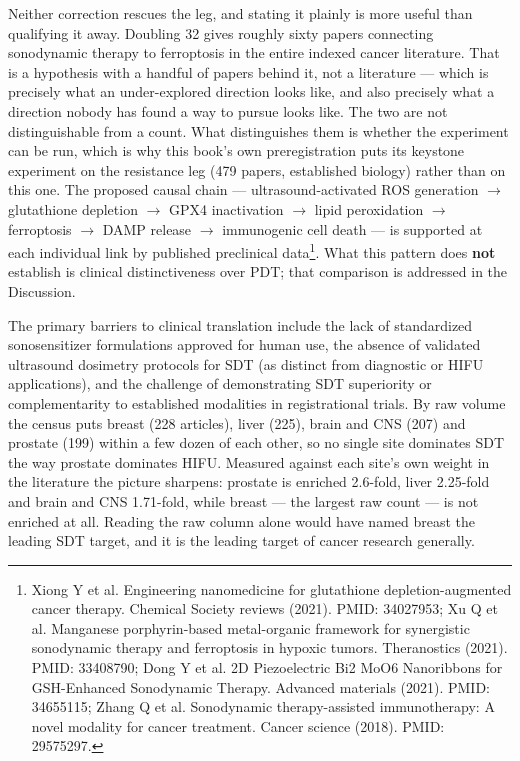 \documentclass[11pt,twoside,openright]{report}
\begin{document}
Neither correction rescues the leg, and stating it plainly is more useful than qualifying it away. Doubling 32 gives roughly sixty papers connecting sonodynamic therapy to ferroptosis in the entire indexed cancer literature. That is a hypothesis with a handful of papers behind it, not a literature --- which is precisely what an under-explored direction looks like, and also precisely what a direction nobody has found a way to pursue looks like. The two are not distinguishable from a count. What distinguishes them is whether the experiment can be run, which is why this book's own preregistration puts its keystone experiment on the resistance leg (479 papers, established biology) rather than on this one. The proposed causal chain --- ultrasound-activated ROS generation $\rightarrow$ glutathione depletion $\rightarrow$ GPX4 inactivation $\rightarrow$ lipid peroxidation $\rightarrow$ ferroptosis $\rightarrow$ DAMP release $\rightarrow$ immunogenic cell death --- is supported at each individual link by published preclinical data\footnote{Xiong Y et al. Engineering nanomedicine for glutathione depletion-augmented cancer therapy. Chemical Society reviews (2021). PMID: 34027953; Xu Q et al. Manganese porphyrin-based metal-organic framework for synergistic sonodynamic therapy and ferroptosis in hypoxic tumors. Theranostics (2021). PMID: 33408790; Dong Y et al. 2D Piezoelectric Bi2 MoO6 Nanoribbons for GSH-Enhanced Sonodynamic Therapy. Advanced materials (2021). PMID: 34655115; Zhang Q et al. Sonodynamic therapy-assisted immunotherapy: A novel modality for cancer treatment. Cancer science (2018). PMID: 29575297.}. What this pattern does \textbf{not} establish is clinical distinctiveness over PDT; that comparison is addressed in the Discussion.

The primary barriers to clinical translation include the lack of standardized sonosensitizer formulations approved for human use, the absence of validated ultrasound dosimetry protocols for SDT (as distinct from diagnostic or HIFU applications), and the challenge of demonstrating SDT superiority or complementarity to established modalities in registrational trials. By raw volume the census puts breast (228 articles), liver (225), brain and CNS (207) and prostate (199) within a few dozen of each other, so no single site dominates SDT the way prostate dominates HIFU. Measured against each site's own weight in the literature the picture sharpens: prostate is enriched 2.6-fold, liver 2.25-fold and brain and CNS 1.71-fold, while breast --- the largest raw count --- is not enriched at all. Reading the raw column alone would have named breast the leading SDT target, and it is the leading target of cancer research generally.
\end{document}

